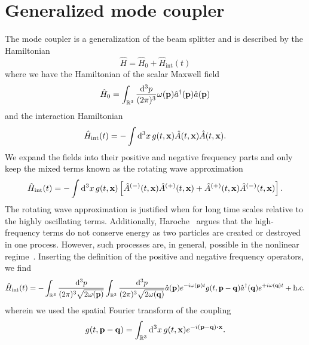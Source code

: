 \section{Generalized mode coupler}

The mode coupler is a generalization of the beam splitter and is described by the Hamiltonian
\begin{equation}
	\hat{H}
	=
	\hat{H}_0
	+
	\hat{H}_\text{int}(t)
\end{equation}
where we have the Hamiltonian of the scalar Maxwell field
\begin{equation}
	\hat{H}_0
	=
	\int_{\mathbb{R}^3}\frac{\dd[3]{p}}{(2\pi)^3}
	\omega(\vb{p})
	\hat{a}^\dagger(\vb{p})
	\hat{a}(\vb{p})
\end{equation}
and the interaction Hamiltonian
\begin{equation}
	\hat{H}_\text{int}(t)
	=
	-
	\int\dd[3]{x}
	g(t,\vb{x})
	\hat{A}(t,\vb{x})
	\hat{A}(t,\vb{x})
	.
\end{equation}
We expand the fields into their positive and negative frequency parts and only keep the mixed terms known as the rotating wave approximation~\cite[p.~158]{Gardiner2000}
\begin{equation}
	\hat{H}_\text{int}(t)
	=
	-
	\int\dd[3]{x}
	g(t,\vb{x})
	\left[
		\hat{A}^{(-)}(t,\vb{x})
		\hat{A}^{(+)}(t,\vb{x})
		+
		\hat{A}^{(+)}(t,\vb{x})
		\hat{A}^{(-)}(t,\vb{x})
	\right]
	.
\end{equation}
The rotating wave approximation is justified when for long time scales relative to the highly oscillating terms.
Additionally, Haroche~\cite[p.~127]{Haroche2006} argues that the high-frequency terms do not conserve energy as two particles are created or destroyed in one process.
However, such processes are, in general, possible in the nonlinear regime~\cite{QuesadaMejia2015}.
Inserting the definition of the positive and negative frequency operators, we find
\begin{equation}
	\hat{H}_\text{int}(t)
	=
	-
	\int_{\mathbb{R}^3}
	\frac{\dd[3]{p}}{(2\pi)^3\sqrt{2\omega(\vb{p})}}
	\int_{\mathbb{R}^3}
	\frac{\dd[3]{p}}{(2\pi)^3\sqrt{2\omega(\vb{q})}}
	\hat{a}(\vb{p})
	e^{-i\omega(\vb{p})t}
	g(t,\vb{p}-\vb{q})
	\hat{a}^\dagger(\vb{q})
	e^{+i\omega(\vb{q})t}
	+
	\text{h.c.}
\end{equation}
wherein we used the spatial Fourier transform of the coupling
\begin{equation}
	g(t,\vb{p}-\vb{q})
	=
	\int_{\mathbb{R}^3}\dd[3]{x}
	g(t,\vb{x})
	e^{-i(\vb{p}-\vb{q})\vdot\vb{x}}
	.
\end{equation}
